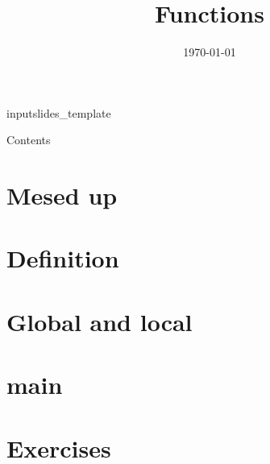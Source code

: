 input{slides_template}  %

\newcommand {\topic}{
    Functions
}

\title{\topic}
\supertitle{\course}
\date{\today}



\maketitle

\begin{frame}{Contents}
    \tableofcontents
\end{frame}

\section{Mesed up}
\subsection{}
\begin{frame}[fragile]{}

\end{frame}
\begin{frame}

\end{frame}
\section{Definition}
\begin{frame}

\end{frame}

\section{Global and local}

\section{main}

\section{Exercises}



